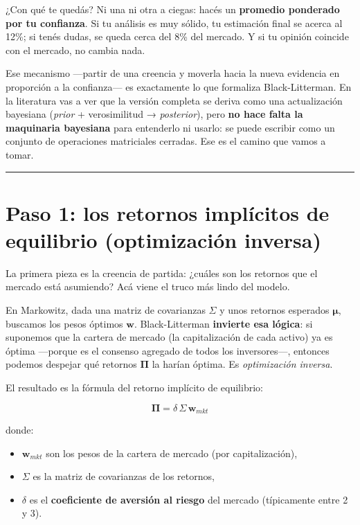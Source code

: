 \documentclass[
  spanish,
  letterpaper,
  DIV=11,
  numbers=noendperiod]{scrreprt}
\providecommand{\tightlist}{%
  \setlength{\itemsep}{0pt}\setlength{\parskip}{0pt}}
\begin{document}
¿Con qué te quedás? Ni una ni otra a ciegas: hacés un \textbf{promedio
ponderado por tu confianza}. Si tu análisis es muy sólido, tu estimación
final se acerca al 12\%; si tenés dudas, se queda cerca del 8\% del
mercado. Y si tu opinión coincide con el mercado, no cambia nada.

Ese mecanismo ---partir de una creencia y moverla hacia la nueva
evidencia en proporción a la confianza--- es exactamente lo que
formaliza Black-Litterman. En la literatura vas a ver que la versión
completa se deriva como una actualización bayesiana (\emph{prior} +
verosimilitud → \emph{posterior}), pero \textbf{no hace falta la
maquinaria bayesiana} para entenderlo ni usarlo: se puede escribir como
un conjunto de operaciones matriciales cerradas. Ese es el camino que
vamos a tomar.

\begin{center}\rule{0.5\linewidth}{0.5pt}\end{center}

\chapter{Paso 1: los retornos implícitos de equilibrio (optimización
inversa)}\label{paso-1-los-retornos-impluxedcitos-de-equilibrio-optimizaciuxf3n-inversa}

La primera pieza es la creencia de partida: ¿cuáles son los retornos que
el mercado está asumiendo? Acá viene el truco más lindo del modelo.

En Markowitz, dada una matriz de covarianzas \(\Sigma\) y unos retornos
esperados \(\boldsymbol{\mu}\), buscamos los pesos óptimos
\(\mathbf{w}\). Black-Litterman \textbf{invierte esa lógica}: si
suponemos que la cartera de mercado (la capitalización de cada activo)
ya es óptima ---porque es el consenso agregado de todos los
inversores---, entonces podemos despejar qué retornos
\(\boldsymbol{\Pi}\) la harían óptima. Es \emph{optimización inversa}.

El resultado es la fórmula del retorno implícito de equilibrio:

\[\boldsymbol{\Pi} = \delta \, \Sigma \, \mathbf{w}_{mkt}\]

donde:

\begin{itemize}
\tightlist
\item
  \(\mathbf{w}_{mkt}\) son los pesos de la cartera de mercado (por
  capitalización),
\item
  \(\Sigma\) es la matriz de covarianzas de los retornos,
\item
  \(\delta\) es el \textbf{coeficiente de aversión al riesgo} del
  mercado (típicamente entre 2 y 3).
\end{itemize}
\end{document}

